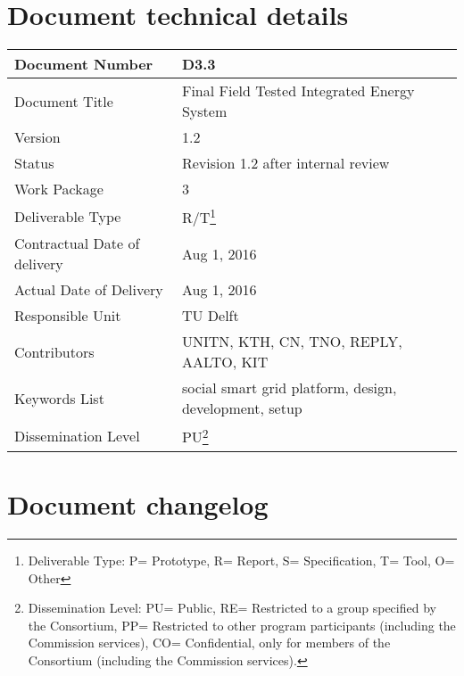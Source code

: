 
\section*{Document technical details}

\begin{tabularx}{\textwidth}{|X|X|}
\hline
Document Number	& D3.3 \\ \hline
Document Title	&  Final Field Tested Integrated Energy System \\ \hline
Version	&  1.2\\ \hline
Status	 &  Revision 1.2 after internal review \\ \hline
Work Package		&  3\\ \hline
Deliverable Type 	&  R/T\footnote{Deliverable Type:  P= Prototype, R= Report, S= Specification, T= Tool, O= Other} \\ \hline
Contractual Date of delivery 	&  Aug 1, 2016\\ \hline
Actual Date of Delivery		&  Aug 1, 2016\\ \hline
Responsible Unit	&  TU Delft \\ \hline
Contributors & UNITN, KTH, CN, TNO, REPLY, AALTO, KIT  \\ \hline
Keywords List &  social smart grid platform, design, development, setup\\ \hline
Dissemination Level	&  PU\footnote{Dissemination Level:  PU= Public, RE= Restricted to a group specified by the Consortium, PP= Restricted to other program participants (including the Commission services), CO= Confidential, only for members of the Consortium (including the Commission services).} \\ \hline
\end{tabularx}


\section*{Document changelog}

